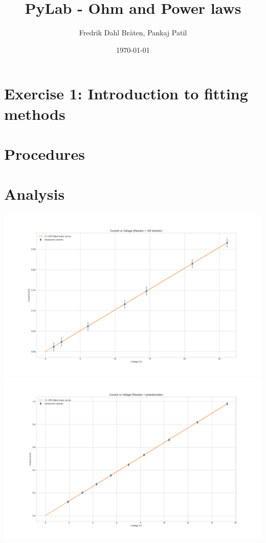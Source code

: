 \documentclass[letterpaper,12pt]{article}
\begin{document}
\title{PyLab - Ohm and Power laws}
\author{Fredrik Dahl Bråten, Pankaj Patil}
\date{\today}
\maketitle

\section*{Exercise 1:  Introduction to fitting methods}

\section{Procedures}

\linebreak
{}

\section{Analysis}

\begin{center}
    \includegraphics[width=1.0\linewidth]{../lab_1_ex_1_plot_100k.png}    
    \includegraphics[width=1.0\linewidth]{../lab_1_ex_1_plot_potentiometer.png}    
\end{center}
\end{document}
